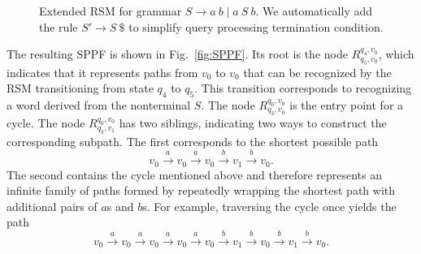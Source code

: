 \documentclass[
11pt,%
tightenlines,%
twoside,%
onecolumn,%
nobibnotes,%
nofootinbib,%
superscriptaddress,%
noshowpacs,%
longbibliography,%
centertags]%
{revtex4-2}
\begin{document}
\begin{figure}
    \centering
    
    \caption{Extended RSM for grammar $S \to a \ b \mid a \ S \ b$. We automatically add the rule $S' \to S \ \$ $ to simplify query processing termination condition.}
    \label{fig:example-rsm}
\end{figure}

The resulting SPPF is shown in Fig.~\ref{fig:SPPF}.
Its root is the node $R^{q_4,v_0}_{q_5,v_0}$, which indicates that it represents paths from $v_0$ to $v_0$ that can be recognized by the RSM transitioning from state $q_4$ to $q_5$.
This transition corresponds to recognizing a word derived from the nonterminal $S$.
The node $R^{q_0,v_0}_{q_3,v_0}$ is the entry point for a cycle.
The node $R^{q_0,v_0}_{q_3,v_1}$ has two siblings, indicating two ways to construct the corresponding subpath.
The first corresponds to the shortest possible path
$$v_0 \xrightarrow{a} v_0 \xrightarrow{a} v_0 \xrightarrow{b} v_1 \xrightarrow{b} v_0.$$
The second contains the cycle mentioned above and therefore represents an infinite family of paths formed by repeatedly wrapping the shortest path with additional pairs of $a$s and $b$s.
For example, traversing the cycle once yields the path
$$v_0 \xrightarrow{a} v_0 \xrightarrow{a} v_0 \xrightarrow{a} v_0 \xrightarrow{a} v_0 \xrightarrow{b} v_1 \xrightarrow{b} v_0 \xrightarrow{b} v_1 \xrightarrow{b} v_0.$$
\end{document}
